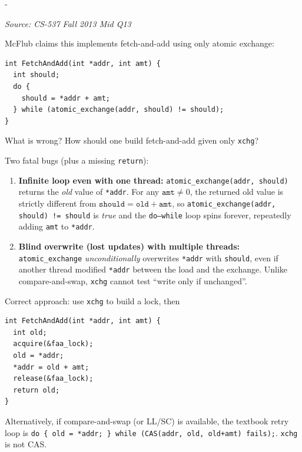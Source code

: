 \documentclass[11pt,a4paper]{article}
\makeatletter
\newcommand{\keepspace}[1]{\par\penalty-100\begingroup
  \setlength{\dimen@}{#1}\dimen@ii\pagegoal\advance\dimen@ii-\pagetotal
  \ifdim\dimen@>\dimen@ii\ifdim\dimen@ii>\z@\vfil\fi\break\fi\endgroup}
\newcounter{qn}[section]
\newenvironment{Qn}[4]{%
  \refstepcounter{qn}\keepspace{7\baselineskip}%
  \begin{tcolorbox}[qboxstyle, title={Q\thesection.\theqn\ \ [#1 \textbar\ #2]\ \ #4}]%
  {\footnotesize\color{g3}\textit{Source: #3}}\par\smallskip%
}{%
  \end{tcolorbox}%
}
\newenvironment{Sol}{%
  \begin{tcolorbox}[sboxstyle, title={Solution}]%
}{%
  \end{tcolorbox}\vspace{0.35em}%
}
\makeatother
\begin{document}
\begin{Qn}{Hard}{Lect 17}{CS-537 Fall 2013 Mid Q13}{Fetch-and-add built from \texttt{xchg} --- why it is wrong}
McFlub claims this implements fetch-and-add using only atomic exchange:

\begin{lstlisting}[numbers=none]
int FetchAndAdd(int *addr, int amt) {
  int should;
  do {
    should = *addr + amt;
  } while (atomic_exchange(addr, should) != should);
}
\end{lstlisting}

What is wrong? How should one build fetch-and-add given only \texttt{xchg}?
\end{Qn}
\begin{Sol}
Two fatal bugs (plus a missing \texttt{return}):
\begin{enumerate}
  \item \textbf{Infinite loop even with one thread:} \texttt{atomic\_exchange(addr, should)} returns the \emph{old} value of \texttt{*addr}. For any $\texttt{amt}\ne 0$, the returned old value is strictly different from $\texttt{should}=\texttt{old}+\texttt{amt}$, so \texttt{atomic\_exchange(addr, should) != should} is \emph{true} and the \texttt{do--while} loop spins forever, repeatedly adding \texttt{amt} to \texttt{*addr}.
  \item \textbf{Blind overwrite (lost updates) with multiple threads:} \texttt{atomic\_exchange} \emph{unconditionally} overwrites \texttt{*addr} with \texttt{should}, even if another thread modified \texttt{*addr} between the load and the exchange. Unlike compare-and-swap, \texttt{xchg} cannot test ``write only if unchanged''.
\end{enumerate}

Correct approach: use \texttt{xchg} to build a lock, then

\begin{lstlisting}[numbers=none]
int FetchAndAdd(int *addr, int amt) {
  int old;
  acquire(&faa_lock);
  old = *addr;
  *addr = old + amt;
  release(&faa_lock);
  return old;
}
\end{lstlisting}

Alternatively, if compare-and-swap (or LL/SC) is available, the textbook retry loop is
\texttt{do \{ old = *addr; \} while (CAS(addr, old, old+amt) fails);}.
\texttt{xchg} is not CAS.
\end{Sol}
\end{document}
